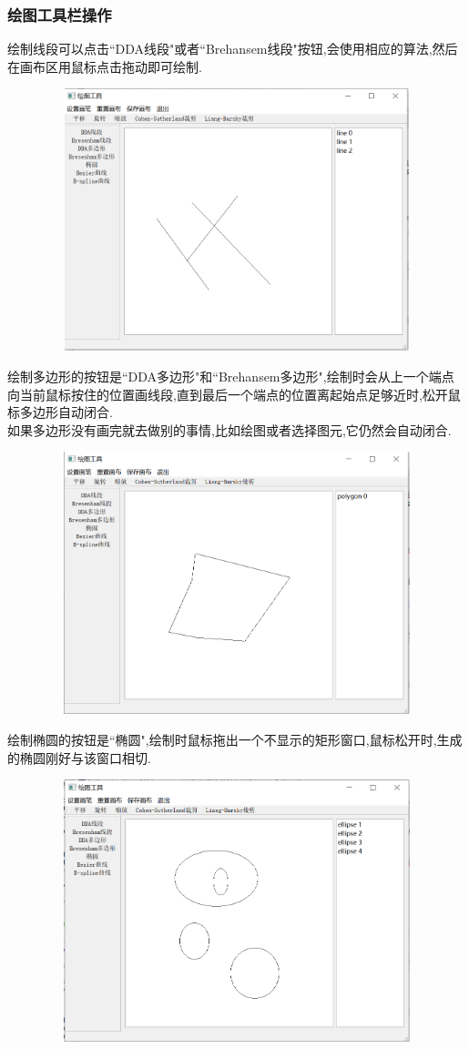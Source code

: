 \documentclass[a4paper,UTF8]{article}
\theoremstyle{definition}
\begin{document}
\subsubsection{绘图工具栏操作}
绘制线段可以点击``DDA线段"或者``Brehansem线段"按钮,会使用相应的算法,然后在画布区用鼠标点击拖动即可绘制.
\begin{figure}[H]
	\includegraphics[width=5in,height=3in]{line.png}
\end{figure}
绘制多边形的按钮是``DDA多边形"和``Brehansem多边形",绘制时会从上一个端点向当前鼠标按住的位置画线段,直到最后一个端点的位置离起始点足够近时,松开鼠标多边形自动闭合.\\
\indent 如果多边形没有画完就去做别的事情,比如绘图或者选择图元,它仍然会自动闭合.
\begin{figure}[H]
	\includegraphics[width=5in,height=3in]{polygon.png}
\end{figure}
绘制椭圆的按钮是``椭圆",绘制时鼠标拖出一个不显示的矩形窗口,鼠标松开时,生成的椭圆刚好与该窗口相切.
\begin{figure}[H]
	\includegraphics[width=5in,height=3in]{ellipse.png}
\end{figure}
\end{document}
